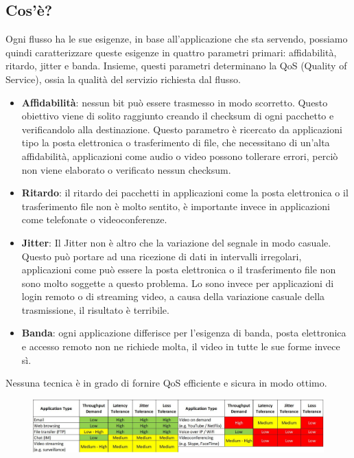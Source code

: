 \subsection{Cos'è?}
Ogni flusso ha le sue esigenze, in base all'applicazione che sta servendo, possiamo quindi caratterizzare queste esigenze in quattro parametri primari: affidabilità, ritardo, jitter e banda. Insieme, questi parametri determinano la QoS (Quality of Service), ossia la qualità del servizio richiesta dal flusso.
\begin{itemize}
\item	\textbf{Affidabilità}: nessun bit può essere trasmesso in modo scorretto. Questo obiettivo viene di solito raggiunto creando il checksum di ogni pacchetto e verificandolo alla destinazione. Questo parametro è ricercato da applicazioni tipo la posta elettronica o trasferimento di file, che necessitano di un'alta affidabilità, applicazioni come audio o video possono tollerare errori, perciò non viene elaborato o verificato nessun checksum.
\item	\textbf{Ritardo}: il ritardo dei pacchetti in applicazioni come la posta elettronica o il trasferimento file non è molto sentito, è importante invece in applicazioni come telefonate o videoconferenze.
\item	\textbf{Jitter}: Il Jitter non è altro che la variazione del segnale in modo casuale. Questo può portare ad una ricezione di dati in intervalli irregolari, applicazioni come può essere la posta elettronica o il trasferimento file non sono molto soggette a questo problema. Lo sono invece per applicazioni di login remoto o di streaming video, a causa della variazione casuale della trasmissione, il risultato è terribile.
\item	\textbf{Banda}: ogni applicazione differisce per l'esigenza di banda, posta elettronica e accesso remoto non ne richiede molta, il video in tutte le sue forme invece sì.
\end{itemize}
Nessuna tecnica è in grado di fornire QoS efficiente e sicura in modo ottimo. 

\begin{figure}[H]
\centering
\includegraphics[scale=0.3]{res/img/40_QoS.png}
\end{figure}